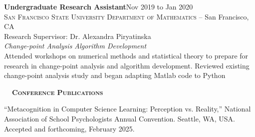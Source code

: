 \documentclass[hidelinks, 10pt]{article}
\def\contentwidth{0.9\linewidth}    %
\def\contentspacing{2.5mm}          %
\def\sectionspacing{6mm}            %
\def\sectiontocontentspacing{4mm}   %
\begin{document}
{\vspace{\contentspacing}


\begin{minipage}[ct]{0.9\linewidth}
    \textbf{Undergraduate Research Assistant}\hfill Nov 2019 to Jan 2020\\
    \textsc{San Francisco State University Department of Mathematics} -- San Francisco, CA\\
    Research Supervisor: Dr. Alexandra Piryatinska\vspace{1mm}\\
    {\textit{Change-point Analysis Algorithm Development}}\\
    Attended workshops on numerical methods and statistical theory to prepare for research in change-point analysis and algorithm
    development. Reviewed existing change-point analysis study and began adapting Matlab code to Python
\end{minipage}

\vspace{\sectionspacing}


{\fontsize{14}{14}\selectfont \textsc{\textbf{\ \ Conference Publications\ \ }}}\hrulefill

\vspace{\sectiontocontentspacing}

\begin{minipage}[ct]{\contentwidth}
    ``Metacognition in Computer Science Learning: Perception vs. Reality,'' National Association of School Psychologists Annual Convention.
    Seattle, WA, USA. Accepted and forthcoming, February 2025.
\end{minipage}

}
\end{document}

